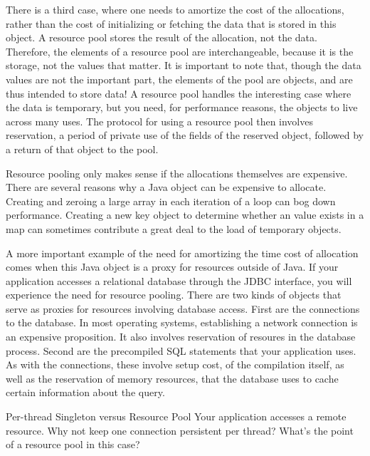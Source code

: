  There is a third case,
where one needs to amortize the cost of the allocations, rather than the cost of
initializing or fetching the data that is stored in this object. A resource pool
stores the result of the allocation, not the data. Therefore, the elements of a
resource pool are interchangeable, because it is the storage, not the values that
matter. It is important to note that, though the data values are not the
important part, the elements of the pool are objects, and are thus intended to
store data! A resource pool handles the interesting case where the data is
temporary, but you need, for performance reasons, the objects to live across many
uses. The protocol for using a resource pool then involves reservation, a period
of private use of the fields of the reserved object, followed by a return of that
object to the pool.

Resource pooling only makes sense if the allocations themselves are expensive.
There are several reasons why a Java object can be expensive to allocate.
Creating and zeroing a large array in each iteration of a
loop can bog down performance. Creating a new key object to determine whether an
value exists in a map can sometimes contribute a great deal to the load of
temporary objects.

A more important example of the need for amortizing the time cost of allocation
comes when this Java object is a proxy for resources outside of Java. If your
application accesses a relational database through the JDBC
interface, you will experience the need for resource pooling. There are two kinds
of objects that serve as proxies for resources involving database access. First
are the connections to the database. In most operating systems, establishing a
network connection is an expensive proposition. It also involves reservation of
resoures in the database process. Second are the precompiled SQL statements that
your application uses. As with the connections, these involve setup cost, of the
compilation itself, as well as the reservation of memory resources, that the
database uses to cache certain information about the query.

\begin{example}{Per-thread Singleton versus Resource Pool}
Your application accesses a remote resource. Why not keep one connection
persistent per thread? What's the point of a resource pool in this case?
\end{example}


